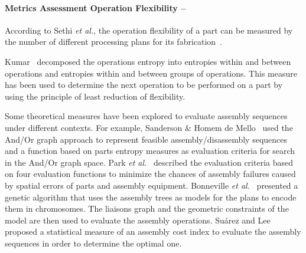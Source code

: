 

\paragraph{Metrics Assessment Operation Flexibility --}
According to Sethi \textit{et al.}, the operation flexibility of a part can be measured by the number of different processing plans for its fabrication~\cite{Sethi.1990}.

Kumar~\cite{Kumar.1988} decomposed the operations entropy into entropies within and between operations and entropies within and between groups of operations. This measure has been used to determine the next operation to be performed on a part by using the principle of least reduction of flexibility.

Some theoretical measures have been explored to evaluate assembly sequences under different contexts. For example, Sanderson \& Homem de Mello~\cite{SANDERSON.1987} used the And/Or graph approach to represent feasible assembly/disassembly sequences and a function based on parts entropy measures as evaluation criteria for search in the And/Or graph space. Park \textit{et al.}~\cite{PARK.1991} described the evaluation criteria based on four evaluation functions to minimize the chances of assembly failures caused by spatial errors of parts and assembly equipment. Bonneville \textit{et al.}~\cite{BONNEVILLE.1995} presented a genetic algorithm that uses the assembly trees as models for the plans to encode them in chromosomes. The liaisons graph and the geometric constraints of the model are then used to evaluate the assembly operations. Su\'{a}rez and Lee~\cite{SUAREZ.1997} proposed a statistical measure of an assembly cost index to evaluate the assembly sequences in order to determine the optimal one.

